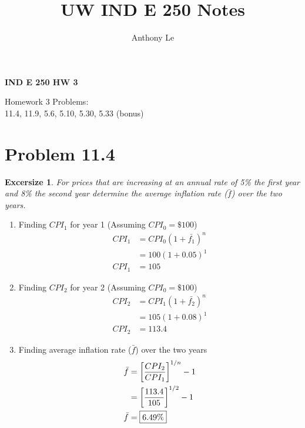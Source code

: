 \documentclass[../INDE250HW.tex]{subfiles}
\title{UW IND E 250 Notes}
\author{Anthony Le}
\newtheorem{exrc}{Excersize}
\begin{document}
\pagestyle{fancy}
\fancyhead{}

\begin{center}
    \LARGE{\textbf{IND E 250 HW 3}}
\end{center}
\begin{center}
    Homework 3 Problems: \\
    11.4, 11.9, 5.6, 5.10, 5.30, 5.33 (bonus)
\end{center}
\section*{Problem 11.4}
\begin{exrc}
   For prices that are increasing at an annual rate of 5\% the first year and 8\% the second year determine the average inflation rate ($\bar{f}$) over the two years.
\end{exrc}
\begin{enumerate}
    \item Finding $CPI_1$ for year 1 (Assuming $CPI_0 = \$100$)
        \begin{equation*}
            \begin{aligned}
                CPI_1 &= CPI_0(1 + \bar{f_1})^n \\
                        &= 100(1 + 0.05)^1 \\
                CPI_1 &= 105
            \end{aligned}
        \end{equation*}
    \item Finding $CPI_2$ for year 2 (Assuming $CPI_0 = \$100$)
        \begin{equation*}
            \begin{aligned}
                CPI_2 &= CPI_1(1 + \bar{f_2})^n \\
                        &= 105(1 + 0.08)^1 \\
                CPI_2 &= 113.4
            \end{aligned}
        \end{equation*}
    \item Finding average inflation rate ($\bar{f}$) over the two years
        \begin{equation*}
            \begin{aligned}
                \bar{f} &= \left[\frac{CPI_2}{CPI_1}\right]^{1/n} - 1 \\
                        &= \left[\frac{113.4}{105}\right]^{1/2} - 1 \\
                \bar{f} &= \framebox{$6.49\%$}
            \end{aligned}
        \end{equation*}
\end{enumerate}
\end{document}
